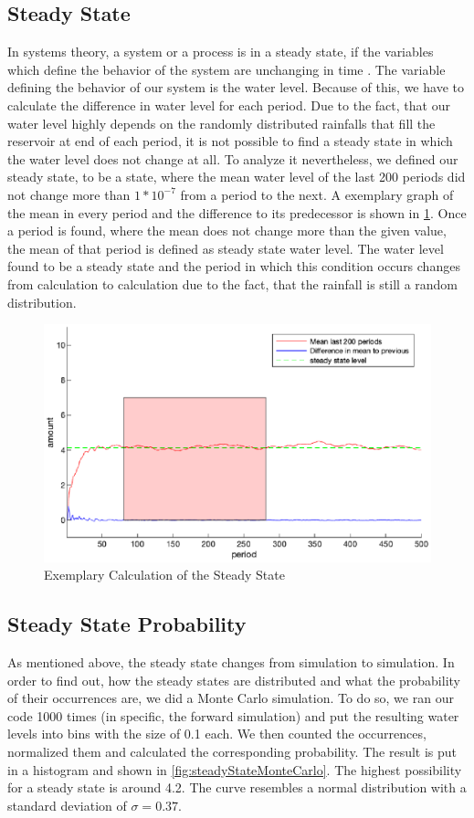 \documentclass[12pt, a4paper, oneside]{article}
\begin{document}
\subsection{Steady State}
In systems theory, a system or a process is in a steady state, if the variables which define the behavior of the system are unchanging in time \citep{gagniuc2017markov}. 
The variable defining the behavior of our system is the water level. 
Because of this, we have to calculate the difference in water level for each period. 
Due to the fact, that our water level highly depends on the randomly distributed rainfalls that fill the reservoir at end of each period, it is not possible to find a steady state in which the water level does not change at all. 
To analyze it nevertheless, we defined our steady state, to be a state, where the mean water level of the last 200 periods did not change more than $1*10^{-7}$ from a period to the next.
A exemplary graph of the mean in every period and the difference to its predecessor is shown in \ref{fig:steadyState}.
Once a period is found, where the mean does not change more than the given value, the mean of that period is defined as steady state water level.
The water level found to be a steady state and the period in which this condition occurs changes from calculation to calculation due to the fact, that the rainfall is still a random distribution.
\begin{figure}[ht]
	\includegraphics[width=1\textwidth]{figures/steadyState.eps}
	\caption{Exemplary Calculation of the Steady State}
	\label{fig:steadyState}
\end{figure}
\subsection{Steady State Probability}
As mentioned above, the steady state changes from simulation to simulation.
In order to find out, how the steady states are distributed and what the probability of their occurrences are, we did a Monte Carlo simulation.
To do so, we ran our code 1000 times (in specific, the forward simulation) and put the resulting water levels into bins with the size of 0.1 each. 
We then counted the occurrences, normalized them and calculated the corresponding probability.
The result is put in a histogram and shown in \ref{fig:steadyStateMonteCarlo}.
The highest possibility for a steady state is around 4.2. 
The curve resembles a normal distribution with a standard deviation of $\sigma=0.37$.
\end{document}
